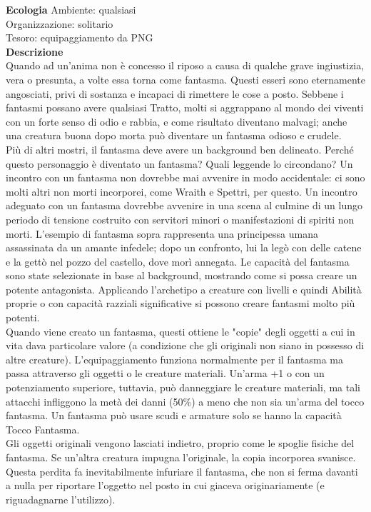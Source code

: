 \begin{multicols}{2}
\textbf{Ecologia}
Ambiente: qualsiasi\\
Organizzazione: solitario\\
Tesoro: equipaggiamento da PNG\\
\textbf{Descrizione}\\
Quando ad un'anima non è concesso il riposo a causa di qualche grave ingiustizia, vera o presunta, a volte essa torna come fantasma. Questi esseri sono eternamente angosciati, privi di sostanza e incapaci di rimettere le cose a posto. Sebbene i fantasmi possano avere qualsiasi Tratto, molti si aggrappano al mondo dei viventi con un forte senso di odio e rabbia, e come risultato diventano  malvagi; anche una creatura buona dopo morta può diventare un fantasma odioso e crudele.\\

Più di altri mostri, il fantasma deve avere un background ben delineato. Perché questo personaggio è diventato un fantasma? Quali leggende lo circondano? Un incontro con un fantasma non dovrebbe mai avvenire in modo accidentale: ci sono molti altri non morti incorporei, come Wraith e Spettri, per questo. Un incontro adeguato con un fantasma dovrebbe avvenire in una scena al culmine di un lungo periodo di tensione costruito con servitori minori o manifestazioni di spiriti non morti. L'esempio di fantasma sopra rappresenta una principessa umana assassinata da un amante infedele; dopo un confronto, lui la legò con delle catene e la gettò nel pozzo del castello, dove morì annegata. Le capacità del fantasma sono state selezionate in base al background, mostrando come si possa creare un potente antagonista. Applicando l'archetipo a creature con livelli e quindi Abilità proprie o con capacità razziali significative si possono creare fantasmi molto più potenti.\\

Quando viene creato un fantasma, questi ottiene le "copie" degli oggetti a cui in vita dava particolare valore (a condizione che gli originali non siano in possesso di altre creature). L'equipaggiamento funziona normalmente per il fantasma ma passa attraverso gli oggetti o le creature materiali. Un'arma +1 o con un potenziamento superiore, tuttavia, può danneggiare le creature materiali, ma tali attacchi infliggono la metà dei danni (50\%) a meno che non sia un'arma del tocco fantasma. Un fantasma può usare scudi e armature solo se hanno la capacità Tocco Fantasma.\\

Gli oggetti originali vengono lasciati indietro, proprio come le spoglie fisiche del fantasma. Se un'altra creatura impugna l'originale, la copia incorporea svanisce. Questa perdita fa inevitabilmente infuriare il fantasma, che non si ferma davanti a nulla per riportare l'oggetto nel posto in cui giaceva originariamente (e riguadagnarne l'utilizzo).\\


\end{multicols}

